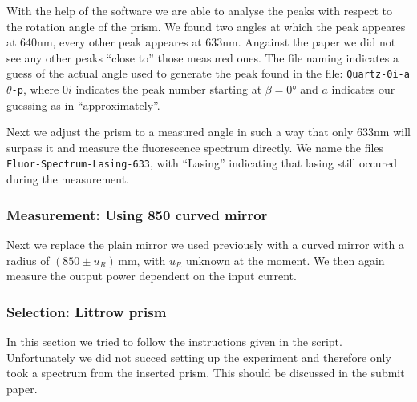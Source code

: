 \documentclass[../../main.tex]{subfiles}
\begin{document}
        With the help of the software we are able to analyse the peaks with respect to the rotation angle of the prism. We found two angles at which the peak appeares at $640\si{\nm}$, every other peak appeares at $633\si{\nm}$. Angainst the paper we did not see any other peaks \enquote{close to} those measured ones. The file naming indicates a guess of the actual angle used to generate the peak found in the file: \texttt{Quartz-0i-a}$\theta$\texttt{-p}, where $0i$ indicates the peak number starting at $\beta=0\si{\degree}$ and $a$ indicates our guessing as in \enquote{approximately}. 

        Next we adjust the prism to a measured angle in such a way that only $633\si{\nm}$ will surpass it and measure the fluorescence spectrum directly. We name the files \texttt{Fluor-Spectrum-Lasing-633}, with \enquote{Lasing} indicating that lasing still occured during the measurement.

    \subsubsection*{Measurement: Using 850 curved mirror}
        Next we replace the plain mirror we used previously with a curved mirror with a radius of $(850\pm u_R)\,\si{\mm}$, with $u_R$ unknown at the moment. We then again measure the output power dependent on the input current. 


    \subsubsection*{Selection: Littrow prism}
        In this section we tried to follow the instructions given in the script. Unfortunately we did not succed setting up the experiment and therefore only took a spectrum from the inserted prism. This should be discussed in the submit paper. 
\end{document}

